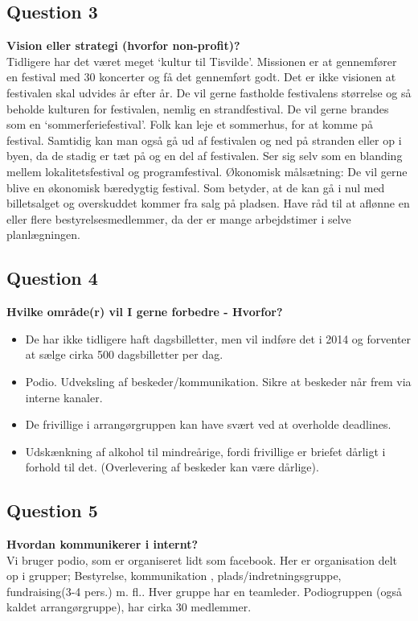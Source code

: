 \subsection{Question 3}
\noindent \textbf{Vision eller strategi (hvorfor non-profit)?} \\
Tidligere har det været meget ‘kultur til Tisvilde’. Missionen er at gennemfører en festival med 30 koncerter og få det gennemført godt. Det er ikke visionen at festivalen skal udvides år efter år. De vil gerne fastholde festivalens størrelse og så beholde kulturen for festivalen, nemlig en strandfestival. De vil gerne brandes som en ‘sommerferiefestival’. Folk kan leje et sommerhus, for at komme på festival. Samtidig kan man også gå ud af festivalen og ned på stranden eller op i byen, da de stadig er tæt på og en del af festivalen. Ser sig selv som en blanding mellem lokalitetsfestival og programfestival.
Økonomisk målsætning: De vil gerne blive en økonomisk bæredygtig festival. Som betyder, at de kan gå i nul med billetsalget og overskuddet kommer fra salg på pladsen. Have råd til at aflønne en eller flere bestyrelsesmedlemmer, da der er mange arbejdstimer i selve planlægningen.

\subsection{Question 4}
\noindent \textbf{Hvilke område(r) vil I gerne forbedre - Hvorfor?} \\
\begin{itemize}
	\item De har ikke tidligere haft dagsbilletter, men vil indføre det i 2014 og forventer at sælge cirka 500 dagsbilletter per dag. 
	\item Podio. Udveksling af beskeder/kommunikation. Sikre at beskeder når frem via interne kanaler. 
	\item De frivillige i arrangørgruppen kan have svært ved at overholde deadlines. 
	\item Udskænkning af alkohol til mindreårige, fordi frivillige er briefet dårligt i forhold til det. (Overlevering af beskeder kan være dårlige).
\end{itemize}

\subsection{Question 5}
\noindent \textbf{Hvordan kommunikerer i internt?} \\
Vi bruger podio, som er organiseret lidt som facebook. Her er organisation delt op i grupper; Bestyrelse, kommunikation , plads/indretningsgruppe, fundraising(3-4 pers.) m. fl.. Hver gruppe har en teamleder. Podiogruppen (også kaldet arrangørgruppe), har cirka 30 medlemmer. 

